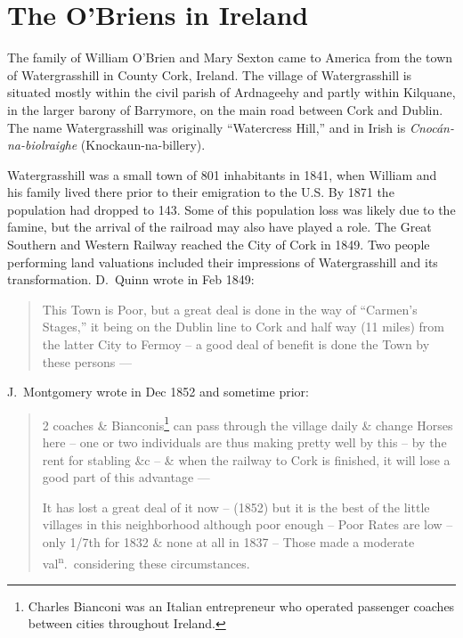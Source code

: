 \chapter{The O'Briens in Ireland}

The family of William O'Brien and Mary Sexton came to America from the town of Watergrasshill in County Cork, Ireland.\cite{Edward2OBrienNaturalization,Michael2OBrienNaturalization,Margaret3DooleyBaptism} The village of Watergrasshill is situated mostly within the civil parish of Ardnageehy and partly within Kilquane, in the larger barony of Barrymore, on the main road between Cork and Dublin.\cite{TopographicalDictionary} The name Watergrasshill was originally ``Watercress Hill,'' and in Irish is \textit{Cnoc\'{a}n-na-biolraighe} (Knockaun-na-billery).\cite{LocalNames} 

Watergrasshill was a small town of 801 inhabitants in 1841, when William and his family lived there prior to their emigration to the U.S. By 1871 the population had dropped to 143.\cite{Population} Some of this population loss was likely due to the famine, but the arrival of the railroad may also have played a role. The Great Southern and Western Railway reached the City of Cork in 1849.\cite{Bianconi} Two people performing land valuations included their impressions of Watergrasshill and its transformation. D.\ Quinn wrote in Feb 1849:

\begin{quote}
	This Town is Poor, but a great deal is done in the way of ``Carmen's Stages,'' it being on the Dublin line to Cork and half way (11 miles) from the latter City to Fermoy -- a good deal of benefit is done the Town by these persons ---\cite{HouseIntro}
\end{quote}

J.\ Montgomery wrote in Dec 1852 and sometime prior:

\begin{quote}
	2 coaches \& Bianconis\footnote{Charles Bianconi was an Italian entrepreneur who operated passenger coaches between cities throughout Ireland.\cite{Bianconi}} can pass through the village daily \& change Horses here -- one or two individuals are thus making pretty well by this -- by the rent for stabling \&c -- \& when the railway to Cork is finished, it will lose a good part of this advantage ---
	
	It has lost a great deal of it now -- (1852) but it is the best of the little villages in this neighborhood although poor enough -- Poor Rates are low -- only 1/7th for 1832 \& none at all in 1837 -- Those made a moderate val\textsuperscript{n}.\ considering these circumstances.\cite{HouseIntro}
\end{quote}

